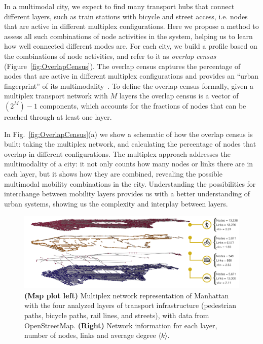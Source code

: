 In a multimodal city, we expect to find many transport hubs that connect different layers, such as train stations with bicycle and street access, i.e. nodes that are active in different multiplex configurations. Here we propose a method to assess all such combinations of node activities in the system, helping us to learn how well connected different modes are. For each city, we build a profile based on the combinations of node activities, and refer to it as \emph{overlap census} (Figure~\ref{fig:OverlapCensus}). The overlap census captures the percentage of nodes that are active in different multiplex configurations and provides an ``urban fingerprint'' of its multimodality~\cite{Aleta2017Multilayer}. To define the overlap census formally, given a multiplex transport network with $M$ layers the overlap census is a vector of $(2^M)-1$ components, which accounts for the fractions of nodes that can be reached through at least one layer.

In Fig.~\ref{fig:OverlapCensus}(a) we show a schematic of how the overlap census is built: taking the multiplex network, and calculating the percentage of nodes that overlap in different configurations. The multiplex approach addresses the multimodality of a city: it not only counts how many nodes or links there are in each layer, but it shows how they are combined, revealing the possible multimodal mobility combinations in the city. Understanding the possibilities for interchange between mobility layers provides us with a better understanding of urban systems, showing us the complexity and interplay between layers.

\begin{figure}[t!]
	\centering
	\includegraphics[width=\textwidth]{images/multiplex/Multilayer_NY_op2.png}
	\caption[Manhattan multiplex network]{\textbf{(Map plot left)} Multiplex network representation of Manhattan with the four analyzed layers of transport infrastructure (pedestrian paths, bicycle paths, rail lines, and streets), with data from OpenStreetMap. \textbf{(Right)} Network information for each layer, number of nodes, links and average degree $\langle k \rangle$.}
	\label{fig:ManhattanMultiplex}
\end{figure}


